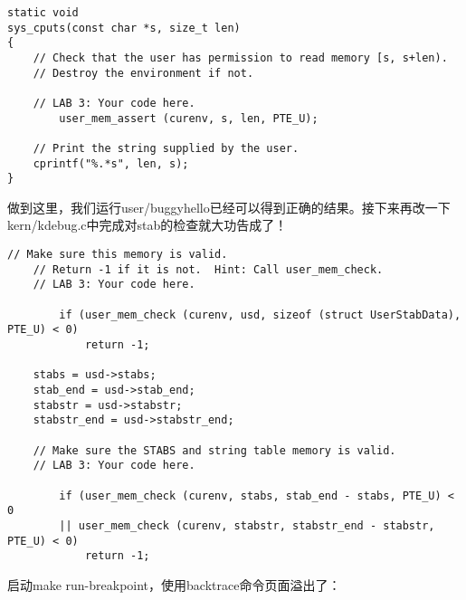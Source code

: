 \documentclass{article}
\begin{document}
\begin{CJK*}{UTF8}{gkai}
\begin{lstlisting}[style=ccode, title={\scriptsize \ttfamily \bfseries kern/syscall.c: sys\_cputs()}]
static void
sys_cputs(const char *s, size_t len)
{
	// Check that the user has permission to read memory [s, s+len).
	// Destroy the environment if not.
	
	// LAB 3: Your code here.
        user_mem_assert (curenv, s, len, PTE_U);

	// Print the string supplied by the user.
	cprintf("%.*s", len, s);
}
\end{lstlisting}

做到这里，我们运行user/buggyhello已经可以得到正确的结果。接下来再改一下kern/kdebug.c中完成对stab的检查就大功告成了！

\begin{lstlisting}[style=ccode, title={\scriptsize \ttfamily \bfseries kern/kdebug.c: debuginfo\_eip()}]
	// Make sure this memory is valid.
	// Return -1 if it is not.  Hint: Call user_mem_check.
	// LAB 3: Your code here.
        
        if (user_mem_check (curenv, usd, sizeof (struct UserStabData), PTE_U) < 0)
            return -1;

	stabs = usd->stabs;
	stab_end = usd->stab_end;
	stabstr = usd->stabstr;
	stabstr_end = usd->stabstr_end;

	// Make sure the STABS and string table memory is valid.
	// LAB 3: Your code here.

        if (user_mem_check (curenv, stabs, stab_end - stabs, PTE_U) < 0
        || user_mem_check (curenv, stabstr, stabstr_end - stabstr, PTE_U) < 0) 
            return -1;
\end{lstlisting}

启动make run-breakpoint，使用backtrace命令页面溢出了：


\end{CJK*}
\end{document}
